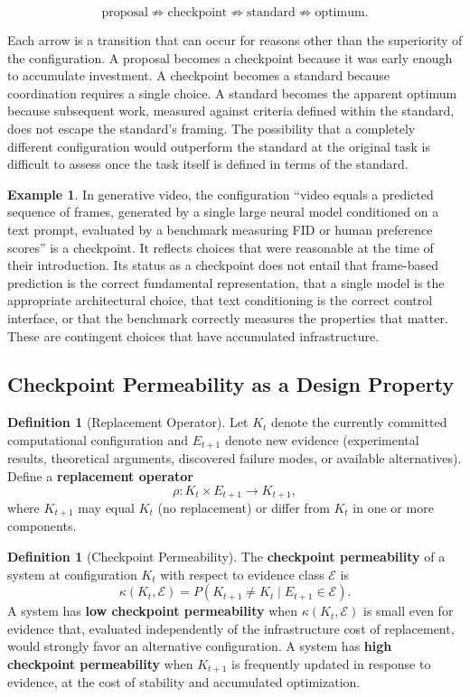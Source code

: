 \documentclass[12pt,a4paper]{article}
\theoremstyle{plain}
\theoremstyle{definition}
\newtheorem{definition}[theorem]{Definition}
\newtheorem{example}[theorem]{Example}
\theoremstyle{remark}
\begin{document}
\[
\text{proposal} \not\Rightarrow \text{checkpoint} \not\Rightarrow \text{standard} \not\Rightarrow \text{optimum}.
\]

Each arrow is a transition that can occur for reasons other than the superiority of the configuration. A proposal becomes a checkpoint because it was early enough to accumulate investment. A checkpoint becomes a standard because coordination requires a single choice. A standard becomes the apparent optimum because subsequent work, measured against criteria defined within the standard, does not escape the standard's framing. The possibility that a completely different configuration would outperform the standard at the original task is difficult to assess once the task itself is defined in terms of the standard.

\begin{example}
In generative video, the configuration ``video equals a predicted sequence of frames, generated by a single large neural model conditioned on a text prompt, evaluated by a benchmark measuring FID or human preference scores'' is a checkpoint. It reflects choices that were reasonable at the time of their introduction. Its status as a checkpoint does not entail that frame-based prediction is the correct fundamental representation, that a single model is the appropriate architectural choice, that text conditioning is the correct control interface, or that the benchmark correctly measures the properties that matter. These are contingent choices that have accumulated infrastructure.
\end{example}

\subsection{Checkpoint Permeability as a Design Property}

\begin{definition}[Replacement Operator]
Let $K_t$ denote the currently committed computational configuration and $E_{t+1}$ denote new evidence (experimental results, theoretical arguments, discovered failure modes, or available alternatives). Define a \textbf{replacement operator}
\[
\rho : K_t \times E_{t+1} \to K_{t+1},
\]
where $K_{t+1}$ may equal $K_t$ (no replacement) or differ from $K_t$ in one or more components.
\end{definition}

\begin{definition}[Checkpoint Permeability]
The \textbf{checkpoint permeability} of a system at configuration $K_t$ with respect to evidence class $\mathcal{E}$ is
\[
\kappa(K_t, \mathcal{E}) = P(K_{t+1} \neq K_t \mid E_{t+1} \in \mathcal{E}).
\]
A system has \textbf{low checkpoint permeability} when $\kappa(K_t, \mathcal{E})$ is small even for evidence that, evaluated independently of the infrastructure cost of replacement, would strongly favor an alternative configuration. A system has \textbf{high checkpoint permeability} when $K_{t+1}$ is frequently updated in response to evidence, at the cost of stability and accumulated optimization.
\end{definition}
\end{document}
